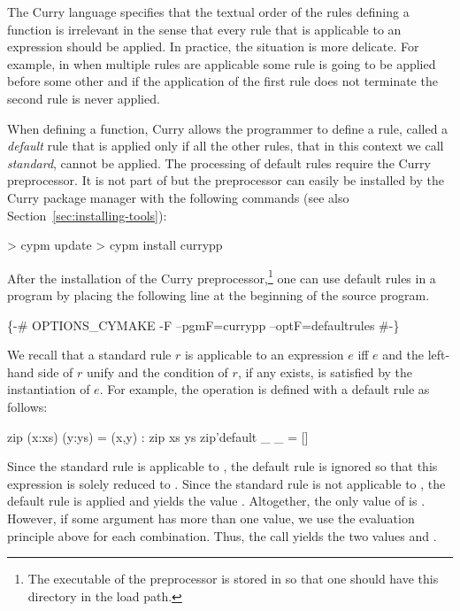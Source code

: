 The Curry language specifies that the textual order of the rules
defining a function is irrelevant in the sense that every rule that is
applicable to an expression should be applied.
In practice, the situation is more delicate.
For example, in \pakcs{} when multiple rules are applicable
some rule is going to be applied before some other
and if the application of the first rule
does not terminate the second rule is never applied.

When defining a function,
Curry allows the programmer to define a rule, called
a \emph{default} rule
\cite{AntoyHanus17TPLP}
that is applied only if all the other rules,
that in this context we call \emph{standard}, cannot be applied.
The processing of default rules require the Curry preprocessor.
It is not part of \pakcs but the preprocessor can easily be installed
by the Curry package manager with the following commands
(see also Section~\ref{sec:installing-tools}):
%
\begin{prog}
> cypm update
> cypm install currypp
\end{prog}
%
After the installation of the Curry preprocessor,\footnote{%
The executable  of the preprocessor is stored in
 so that one should have this directory
in the load path.}
one can use default rules in a program by placing the following
line at the beginning of the source program.
%
\begin{prog}
\{-\# OPTIONS_CYMAKE -F --pgmF=currypp --optF=defaultrules \#-\}  
\end{prog}
%
We recall that a standard rule $r$ is applicable to an expression
$e$ iff $e$ and the left-hand side of $r$ unify and the condition
of $r$, if any exists, is satisfied by the instantiation of $e$.
For example, the operation 
is defined with a default rule as follows:
%
\begin{prog}
zip (x:xs) (y:ys) = (x,y) : zip xs ys
zip'default _ _ = []
\end{prog}
%
Since the standard rule is applicable to , the
default rule is ignored so that this expression is solely reduced to
. Since the standard rule is not applicable to
, the default rule is applied and yields the value \code{[]}.
Altogether, the only value of  is \code{[(1,2)]}.
However, if
some argument has more than one value, we use the evaluation principle
above for each combination.  Thus, the call  yields
the two values \code{[(1,2)]} and \code{[]}.

